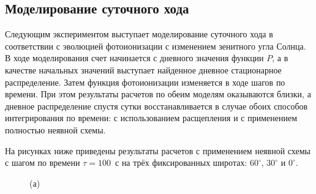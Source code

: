\documentclass[14pt, a4paper]{extarticle}
\begin{document}







\subsection{Моделирование суточного хода}

Следующим экспериментом выступает моделирование суточного хода в соответствии с эволюцией фотоионизации с изменением зенитного угла Солнца. В ходе моделирования счет начинается с дневного значения функции $P$, а в качестве начальных значений выступает найденное дневное стационарное распределение. Затем функция фотоионизации изменяется в ходе шагов по времени. При этом результаты расчетов по обеим моделям оказываются близки, а дневное распределение спустя сутки восстанавливается в случае обоих способов интегрирования по времени: с использованием расщепления и с применением полностью неявной схемы.

На рисунках ниже приведены результаты расчетов с применением неявной схемы с шагом по времени $\tau = 100$~с на трёх фиксированных широтах: $60^\circ$, $30^\circ$ и $0^\circ$.


\begin{figure}[H]

(а) 

\end{figure}
\end{document}
